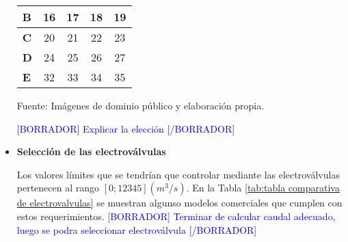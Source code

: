\begin{itemize}
\begin{mytable}[H]
\begin{tabular}{l|c|c|c|c|}
			\multicolumn{1}{|l|}{\textbf{B}}          & 16                                                                    & 17         & 18         & 19         \\ \hline
			\multicolumn{1}{|l|}{\textbf{C}}          & 20                                                                    & 21         & 22         & 23         \\ \hline
			\multicolumn{1}{|l|}{\textbf{D}}          & 24                                                                    & 25         & 26         & 27         \\ \hline
			\multicolumn{1}{|l|}{\textbf{E}}          & 32                                                                    & 33         & 34         & 35         \\ \hline
		\end{tabular}
		\begin{flushleft}	
			Fuente: Imágenes de dominio público y elaboración propia.
		\end{flushleft}
	\end{mytable}
	
	\textcolor{blue}{[BORRADOR] Explicar la elección [/BORRADOR]}
	
	\item \textbf{Selección de las electroválvulas}
	
	Los valores límites que se tendrían que controlar mediante las electroválvulas pertenecen al rango $[0;12345] (m^3/s)$. En la Tabla \ref{tab:tabla comparativa de electrovalvulas} se muestran algunso modelos comerciales que cumplen con estos requerimientos. \textcolor{blue}{[BORRADOR] Terminar de calcular caudal adecuado, luego se podra seleccionar electroválvula [/BORRADOR]}
	

\end{itemize}
